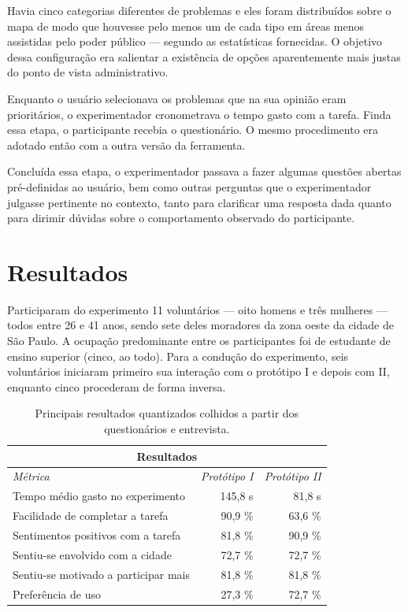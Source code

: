 \documentclass{sigchi}
\begin{document}
Havia cinco categorias diferentes de problemas e eles foram distribuídos sobre o mapa de modo que houvesse pelo menos um de cada tipo em áreas menos assistidas pelo poder público --- segundo as estatísticas fornecidas. O objetivo dessa configuração era salientar a existência de opções aparentemente mais justas do ponto de vista administrativo.

Enquanto o usuário selecionava os problemas que na sua opinião eram prioritários, o experimentador cronometrava o tempo gasto com a tarefa. Finda essa etapa, o participante recebia o questionário. O mesmo procedimento era adotado então com a outra versão da ferramenta.

Concluída essa etapa, o experimentador passava a fazer algumas questões abertas pré-definidas ao usuário, bem como outras perguntas que o experimentador julgasse pertinente no contexto, tanto para clarificar uma resposta dada quanto para dirimir dúvidas sobre o comportamento observado do participante.


\section{Resultados}
Participaram do experimento 11 voluntários --- oito homens e três mulheres --- todos entre 26 e 41 anos, sendo sete deles moradores da zona oeste da cidade de São Paulo. A ocupação predominante entre os participantes foi de estudante de ensino superior (cinco, ao todo). Para a condução do experimento, seis voluntários iniciaram primeiro sua interação com o protótipo I e depois com II, enquanto cinco procederam de forma inversa.

\begin{table}
	\centering
	\begin{tabular}{l r r}
		\multicolumn{3}{c}{\small{\textbf{Resultados}}} \\
		\midrule
		{\small\textit{Métrica}}
		& {\small \textit{Protótipo I}}
		& {\small \textit{Protótipo II}} \\
		\midrule
		Tempo médio gasto no experimento & 145,8 s & 81,8 s\\
		Facilidade de completar a tarefa & 90,9 \% & 63,6 \%\\
		Sentimentos positivos com a tarefa & 81,8 \% & 90,9 \% \\
		Sentiu-se envolvido com a cidade & 72,7 \% & 72,7 \%\\
		Sentiu-se motivado a participar mais & 81,8 \% & 81,8 \%\\
		Preferência de uso & 27,3 \% & 72,7 \%\\
	\end{tabular}
	\caption{Principais resultados quantizados colhidos a partir dos questionários e entrevista.}~\label{tab:table1}
\end{table}
\end{document}
